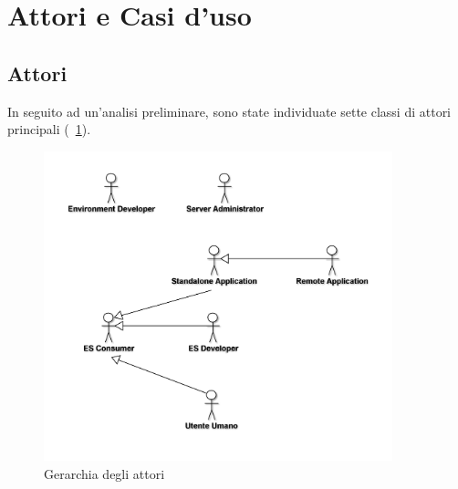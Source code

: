 \section{Attori e Casi d'uso}

\subsection{Attori}

In seguito ad un'analisi preliminare, sono state individuate sette classi di attori principali (\figurename~\ref{fig:attori}).

\begin{figure}[h]
\centering
\includegraphics[width=0.9\textwidth]{Immagini/Capitolo2/UseCases/Attori.png}
\caption{Gerarchia degli attori}\label{fig:attori}
\end{figure}

